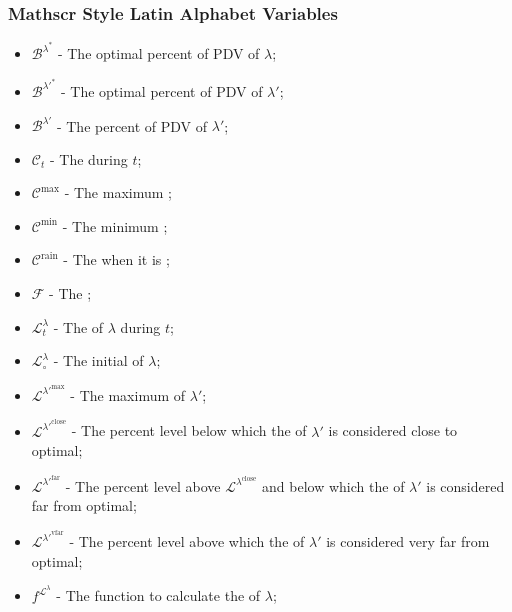 \documentclass[class=article, crop=false]{standalone}
\begin{document}

\subsubsection{Mathscr Style Latin Alphabet Variables}

\begin{itemize}[topsep=0pt, itemsep=3pt,leftmargin=16pt]
    \item[] $\mathscr{B}^{\lambda^{*}}$ - The optimal percent of  PDV of $\lambda$;
    \item[] $\mathscr{B}^{\lambda'^{*}}$ - The optimal percent of  PDV of $\lambda'$;
    \item[] $\mathscr{B}^{\lambda'}$ - The percent of  PDV of $\lambda'$;
    \item[] $\mathscr{C}_{t}$ - The  during $t$;
    \item[] $\mathscr{C}^{\text{max}}$ - The maximum ;
    \item[] $\mathscr{C}^{\text{min}}$ - The minimum ;
    \item[] $\mathscr{C}^{\text{rain}}$ - The  when it is ;
    \item[] $\mathscr{F}$ - The ;
    \item[] $\mathscr{L}_{t}^{\lambda}$ - The  of $\lambda$ during $t$;
    \item[] $\mathscr{L}_{\circ}^{\lambda}$ - The initial  of $\lambda$;
    \item[] $\mathscr{L}^{\lambda'^{\text{max}}}$ - The maximum  of $\lambda'$;
    \item[] $\mathscr{L}^{\lambda'^{\text{close}}}$ - The percent level below which the  of $\lambda'$ is considered close to optimal;
    \item[] $\mathscr{L}^{\lambda'^{\text{far}}}$ - The percent level above $\mathscr{L}^{\lambda^{\text{close}}}$ and below which the  of $\lambda'$ is considered far from optimal;
    \item[] $\mathscr{L}^{\lambda'^{\text{vfar}}}$ - The percent level above which the  of $\lambda'$ is considered very far from optimal;
    \item[] $f^{\mathscr{L}^{\lambda}}$ - The function to calculate the  of $\lambda$;

\end{itemize}
\end{document}

